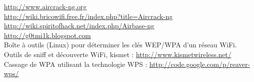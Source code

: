 \documentclass[a4paper,11pt]{article}				    %
\begin{document}
\newpage
\tableofcontents
\label{refSommaire}
{
\url{http://www.aircrack-ng.org}\\
\url{http://wiki.bricowifi.free.fr/index.php?title=Aircrack-ng}\\
\url{http://wiki.spiritofhack.net/index.php/Airbase-ng}\\
\url{http://g0tmi1k.blogspot.com}
}
{
\\Bo\^ite \`a outils (Linux) pour d\'eterminer les cl\'es WEP/WPA d'un r\'eseau WiFi.\\
Outils de sniff et d\'ecouverte WiFi, kismet : \url{http://www.kismetwireless.net/}\\
Cassage de WPA utilisant la technologie WPS : \url{http://code.google.com/p/reaver-wps/}
}
\end{document}
